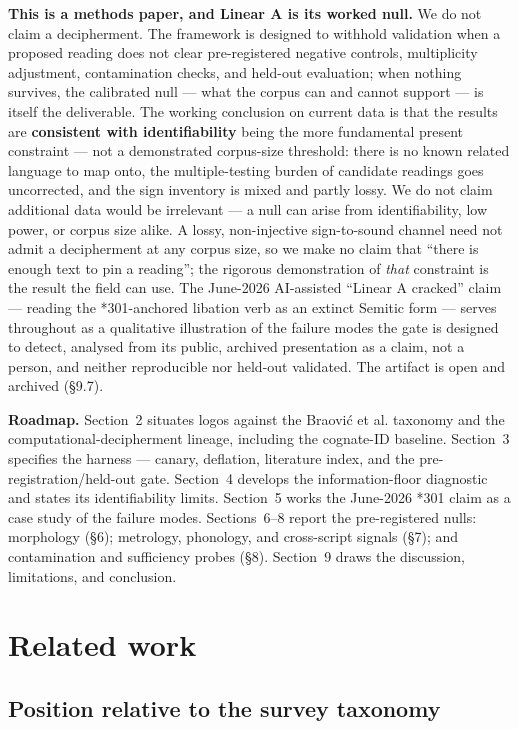 \textbf{This is a methods paper, and Linear A is its worked null.} We do
not claim a decipherment. The framework is designed to withhold
validation when a proposed reading does not clear pre-registered negative
controls, multiplicity adjustment, contamination checks, and held-out
evaluation; when nothing survives, the calibrated null --- what the
corpus can and cannot support --- is itself the deliverable. The working
conclusion on current data is that the results are \textbf{consistent
with identifiability} being the more fundamental present constraint ---
not a demonstrated corpus-size threshold: there is no known related
language to map onto, the multiple-testing burden of candidate readings
goes uncorrected, and the sign inventory is mixed and partly lossy. We do
not claim additional data would be irrelevant --- a null can arise from
identifiability, low power, or corpus size alike. A lossy, non-injective
sign-to-sound channel need not admit a decipherment at any corpus size,
so we make no claim that ``there is enough text to pin a reading''; the
rigorous demonstration of \emph{that} constraint is the result the field
can use. The June-2026 AI-assisted ``Linear A cracked'' claim --- reading
the *301-anchored libation verb as an extinct Semitic form --- serves
throughout as a qualitative illustration of the failure modes the gate is
designed to detect, analysed from its public, archived presentation as a
claim, not a person, and neither reproducible nor held-out validated.
The artifact is open and archived (\S9.7).

\textbf{Roadmap.} Section~2 situates logos against the Braovi\'{c} et al.
taxonomy and the computational-decipherment lineage, including the
cognate-ID baseline. Section~3 specifies the harness --- canary,
deflation, literature index, and the pre-registration/held-out gate.
Section~4 develops the information-floor diagnostic and states its
identifiability limits. Section~5 works the June-2026 *301 claim as a
case study of the failure modes. Sections~6--8 report the pre-registered
nulls: morphology (\S6); metrology, phonology, and cross-script signals
(\S7); and contamination and sufficiency probes (\S8). Section~9 draws
the discussion, limitations, and conclusion.

\section{Related work}

\subsection{Position relative to the survey taxonomy}

